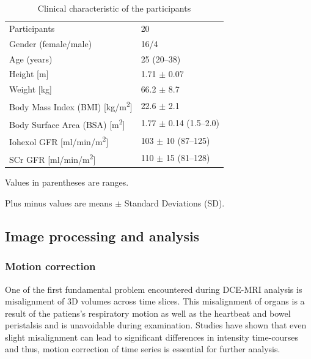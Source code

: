 \begin{table}[h!]
\centering
\caption[Clinical characteristic of the participants]{Clinical characteristic of the participants \cite{eikefjord2017dynamic}}
\label{tab:participants}
\begin{threeparttable}
\renewcommand{\arraystretch}{1.25}
\begin{tabular}{L{7cm} R{4cm}}
	\toprule

 	Participants & 20\\
  	Gender (female/male) &16/4\\
  	Age (years) & 25 (20--38)\\
  	Height [m] & 1.71 $\pm$ 0.07\\
  	Weight [kg] & 66.2 $\pm$ 8.7\\
  	Body Mass Index (BMI) [kg/m\textsuperscript{2}] & 22.6 $\pm$ 2.1\\
  	Body Surface Area (BSA) [m\textsuperscript{2}]& 1.77 $\pm$ 0.14 (1.5--2.0) \\
  	Iohexol GFR [ml/min/m\textsuperscript{2}] &103 $\pm$ 10 (87--125)\\
  	SCr GFR [ml/min/m\textsuperscript{2}] & 110 $\pm$ 15 (81--128)\\
  \bottomrule

\end{tabular}
\begin{tablenotes}%
\footnotesize{}%
\item Values in parentheses are ranges.
\item Plus minus values are means $\pm$ Standard Deviations (SD).
    \end{tablenotes}
	\end{threeparttable}
\end{table}

\subsection{Image processing and analysis}

\subsubsection{Motion correction}
One of the first fundamental problem encountered during DCE-MRI analysis is misalignment of 3D volumes across time slices. This misalignment of organs is a result of the patiens's respiratory motion as well as the heartbeat and bowel peristalsis and is unavoidable during examination. Studies have shown that even slight misalignment can lead to significant differences in intensity time-courses \cite{KidneySubsegmentation} and thus, motion correction of time series is essential for further analysis.

